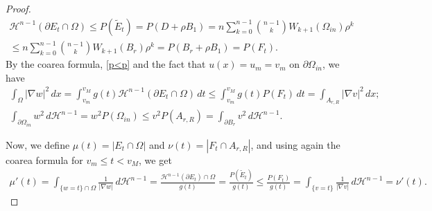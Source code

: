 \documentclass[oneside,a4paper,11pt,notitlepage]{article}
\newcommand{\abs}[1]{{\left|#1\right|}}
\theoremstyle{plain}
\numberwithin{teor}{section}
\numberwithin{equation}{section}
\theoremstyle{definition}
\theoremstyle{plain}
\theoremstyle{plain}
\theoremstyle{plain}
\theoremstyle{plain}
\theoremstyle{definition}
\theoremstyle{definition}
\theoremstyle{plain}
\begin{document}
\begin{proof}
\begin{equation}
\label{p<p}
    \begin{multlined}
    \mathcal{H}^{n-1}(\partial E_t \cap \Omega) \leq P(\tilde E_t) = P(D+\rho B_1) = n \sum_{k=0}^{n-1} \binom{n-1}{k} W_{k+1}(\Omega_{in})\rho^k \\
        \leq n \sum_{k=0}^{n-1} \binom{n-1}{k} W_{k+1}(B_r)\rho^k  = P(B_r +\rho B_1)= P(F_t).
    \end{multlined}
\end{equation}
 By the coarea formula, \eqref{p<p} and the fact that $u(x)=u_m=v_m$ on $\partial \Omega_{in}$, we have
 \begin{equation}
     \label{disnormabordo}
      \begin{gathered}
     \int_{\Omega} \abs{\nabla w}^2 \, dx = \int_{v_m}^{v_M} g(t)\mathcal{H}^{n-1}(\partial E_t \cap \Omega) \, dt \leq \int_{v_m}^{v_M} g(t) P(F_t) \, dt = \int_{A_{r,R}} \abs{\nabla v}^2 \, dx;\\
     \int_{\partial \Omega_{in}} w^2 \, d\mathcal{H}^{n-1} = w^2P(\Omega_{in}) \leq v^2P(A_{r,R}) =\int_{\partial B_r} v^2 \, d\mathcal{H}^{n-1}.
 \end{gathered}
 \end{equation}


Now, we define $\mu(t)= \abs{E_t \cap \Omega}$ and $\nu(t) = \abs{F_t \cap A_{r,R}}$, and using again the coarea formula for $v_m \leq t < v_M$, we get
\begin{equation}
    \begin{multlined}
        \mu'(t) = \int_{\{w=t\} \cap \Omega} \frac{1}{\abs{\nabla w}} \, d \mathcal{H}^{n-1} = \frac{ \mathcal{H}^{n-1}( \partial E_t) \cap \Omega}{ g(t)} = \frac{ P( \tilde E_t) }{ g(t)}
        \leq \frac{ P( F_t) }{ g(t)} = \int_{\{v=t\}} \frac{1}{\abs{\nabla v}} \, d \mathcal{H}^{n-1} = \nu'(t).
    \end{multlined}
\end{equation}


\end{proof}
\end{document}
